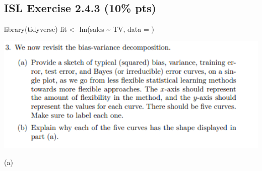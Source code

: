 \documentclass[
]{article}
\newenvironment{Shaded}{\begin{snugshade}}{\end{snugshade}}
\newcommand{\AttributeTok}[1]{\textcolor[rgb]{0.40,0.45,0.13}{#1}}
\newcommand{\FunctionTok}[1]{\textcolor[rgb]{0.28,0.35,0.67}{#1}}
\newcommand{\NormalTok}[1]{\textcolor[rgb]{0.00,0.23,0.31}{#1}}
\newcommand{\OtherTok}[1]{\textcolor[rgb]{0.00,0.23,0.31}{#1}}
\newcommand{\SpecialCharTok}[1]{\textcolor[rgb]{0.37,0.37,0.37}{#1}}
\begin{document}
\hypertarget{isl-exercise-2.4.3-10-pts}{%
\subsection{ISL Exercise 2.4.3 (10\%
pts)}\label{isl-exercise-2.4.3-10-pts}}

\begin{Shaded}
\begin{Highlighting}[]
\FunctionTok{library}\NormalTok{(tidyverse)}
\NormalTok{fit }\OtherTok{\textless{}{-}} \FunctionTok{lm}\NormalTok{(sales }\SpecialCharTok{\textasciitilde{}}\NormalTok{ TV, }\AttributeTok{data =}\NormalTok{ )}
\end{Highlighting}
\end{Shaded}

\includegraphics[width=5.48958in,height=\textheight]{images/clipboard-2321342665.png}

(a)
\end{document}
